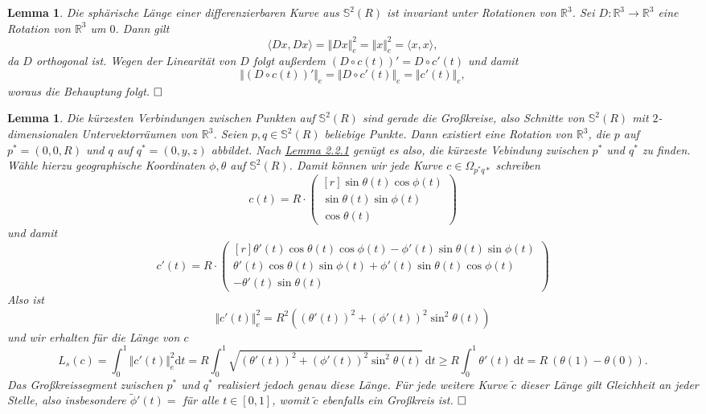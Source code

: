 \documentclass[11pt]{book}
\numberwithin{dummy}{section}
\newtheorem{lemma}[theorem]{Lemma}
\theoremstyle{nonumberbreak}
\newenvironment{pr}[1][]{\ifthenelse{\equal{#1}{}}{\proof}{\proof[#1]}\rm}{\endproof}
\newcommand{\R}{\mathbb{R}}
\newcommand{\Sph}{\mathbb{S}}
\newcommand{\la}{\longrightarrow}
\begin{document}
\begin{spacing}{1.4}
\hypertarget{lemmazweizweieins}{}
\begin{lemma} %
Die sphärische Länge einer differenzierbaren Kurve aus $\Sph^2(R)$ ist invariant unter Rotationen von $\R^3$.
\begin{pr}
Sei $D: \R^3 \la \R^3$ eine Rotation von $\R^3$ um $0$. Dann gilt 
$$\langle Dx, Dx \rangle = \Vert Dx \Vert_e^2 = \Vert x \Vert_e^2 = \langle x, x \rangle,$$
da $D$ orthogonal ist. Wegen der Linearität von $D$ folgt außerdem 
$(D \circ c(t))' = D \circ c'(t)$
und damit 
$$\Vert (D \circ c(t))' \Vert_e = \Vert D \circ c'(t) \Vert_e = \Vert c'(t)\Vert_e,$$
woraus die Behauptung folgt. $\hfill \Box$
\end{pr}

\end{lemma}


\hypertarget{lemmazweizweizwei}{}
\begin{lemma} %
Die kürzesten Verbindungen zwischen Punkten auf $\Sph^2(R)$ sind gerade die Großkreise, also Schnitte von $\Sph^2(R)$ mit $2$-dimensionalen Untervektorräumen von $\R^3$.
\begin{pr}
Seien $p,q \in \Sph^2(R)$ beliebige Punkte. Dann existiert eine Rotation von $\R^3$, die $p$ auf $p^*=(0,0,R)$ und $q$ auf $q^*=(0,y,z)$ abbildet. Nach \hyperlink{lemmazweizweieins}{Lemma 2.2.1} genügt es also, die kürzeste Vebindung zwischen $p^*$ und $q^*$ zu finden. Wähle hierzu geographische Koordinaten $\phi, \theta$ auf $\Sph^2(R)$. Damit können wir jede Kurve $c \in \Omega_{p^*q*}$ schreiben
$$c(t) = R \cdot \begin{pmatrix}[r] \sin \theta(t) \cos \phi(t) \\ \sin \theta(t) \sin \phi(t) \\ \cos \theta(t) \end{pmatrix}$$
und damit 
$$c'(t) = R \cdot \begin{pmatrix}[r] \theta'(t) \cos \theta(t) \cos \phi(t) - \phi'(t) \sin \theta(t) \sin \phi(t) \\ \theta'(t) \cos \theta(t) \sin \phi(t) + \phi'(t) \sin \theta(t) \cos \phi(t) \\ - \theta'(t) \sin \theta(t) \end{pmatrix}$$
Also ist 
$$\Vert c'(t) \Vert_e^2 = R^2 ( (\theta'(t))^2 + (\phi'(t))^2 \sin ^2 \theta(t))$$
und wir erhalten für die Länge von $c$
$$L_s(c) = \int_0^1 \Vert c'(t) \Vert_e^2 \mathrm{d}t =R \int_0^1 \sqrt{ (\theta'(t))^2 + (\phi'(t))^2 \sin^2 \theta(t) } \ \mathrm{d} t \geqslant R \int_0^1 \theta'(t) \ \mathrm{d} t = R\ (\theta(1) - \theta(0)).$$
Das Großkreissegment zwischen $p^*$ und $q^*$ realisiert jedoch genau diese Länge. Für jede weitere Kurve $\tilde{c}$ dieser Länge gilt Gleichheit an jeder Stelle, also insbesondere $\tilde{\phi}'(t)=$ für alle $t \in [0,1]$, womit $\tilde{c}$ ebenfalls ein Großkreis ist. $\hfill \Box$ 
\end{pr}
\end{lemma}


\end{spacing}
\end{document}

